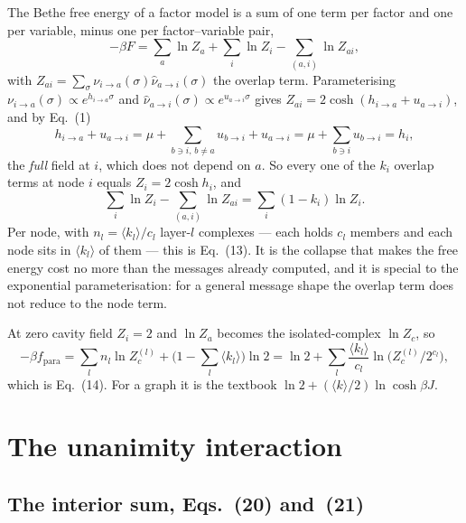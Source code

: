 \documentclass[aps,pre,onecolumn,superscriptaddress,floatfix,nofootinbib]{revtex4-2}
\newcommand{\ave}[1]{\langle #1 \rangle}
\begin{document}
The Bethe free energy of a factor model is a sum of one term per factor and one
per variable, minus one per factor--variable pair,
\begin{equation}
  -\beta F=\sum_a\ln Z_a+\sum_i\ln Z_i-\sum_{(a,i)}\ln Z_{ai},
\end{equation}
with $Z_{ai}=\sum_\sigma\nu_{i\to a}(\sigma)\hat\nu_{a\to i}(\sigma)$ the
overlap term. Parameterising $\nu_{i\to a}(\sigma)\propto e^{h_{i\to a}\sigma}$
and $\hat\nu_{a\to i}(\sigma)\propto e^{u_{a\to i}\sigma}$ gives
$Z_{ai}=2\cosh(h_{i\to a}+u_{a\to i})$, and by Eq.~(1)
\begin{equation}
  h_{i\to a}+u_{a\to i}
  =\mu+\sum_{b\ni i,\,b\neq a}u_{b\to i}+u_{a\to i}
  =\mu+\sum_{b\ni i}u_{b\to i}=h_i ,
\end{equation}
the \emph{full} field at $i$, which does not depend on $a$. So every one of the
$k_i$ overlap terms at node $i$ equals $Z_i=2\cosh h_i$, and
\begin{equation}
  \sum_i\ln Z_i-\sum_{(a,i)}\ln Z_{ai}=\sum_i(1-k_i)\ln Z_i .
\end{equation}
Per node, with $n_l=\ave{k_l}/c_l$ layer-$l$ complexes --- each holds $c_l$
members and each node sits in $\ave{k_l}$ of them --- this is Eq.~(13). It is
the collapse that makes the free energy cost no more than the messages already
computed, and it is special to the exponential parameterisation: for a general
message shape the overlap term does not reduce to the node term.

At zero cavity field $Z_i=2$ and $\ln Z_a$ becomes the isolated-complex
$\ln Z_c$, so
\begin{equation}
  -\beta f_{\mathrm{para}}
   =\sum_l n_l\ln Z^{(l)}_c+\Big(1-\sum_l\ave{k_l}\Big)\ln 2
   =\ln 2+\sum_l\frac{\ave{k_l}}{c_l}\ln\!\big(Z^{(l)}_c/2^{c_l}\big),
\end{equation}
which is Eq.~(14). For a graph it is the textbook
$\ln 2+(\ave{k}/2)\ln\cosh\beta J$.

\section{The unanimity interaction}
\label{sec:simplicial}

\subsection{The interior sum, Eqs.~(20) and~(21)}
\end{document}
